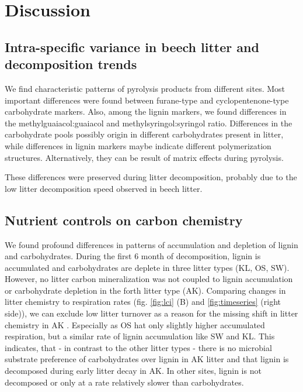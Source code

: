 \section{Discussion}

\subsection{Intra-specific variance in beech litter and decomposition trends}

We find characteristic patterns of pyrolysis products from different sites. Most important differences were found between furane-type and cyclopentenone-type carbohydrate markers. Also, among the lignin markers, we found differences in the methylguaiacol:guaiacol and methylsyringol:syringol ratio. Differences in the carbohydrate pools possibly origin in different carbohydrates present in litter, while differences in lignin markers maybe indicate different polymerization structures. Alternatively, they can be result of matrix effects during pyrolysis. 

These differences were preserved during litter decomposition, probably due to the low litter decomposition speed observed in beech litter.

\subsection{Nutrient controls on carbon chemistry}

We found profound differences in patterns of accumulation and depletion of lignin and carbohydrates. During the first 6 month of decomposition, lignin is accumulated and carbohydrates are deplete in three litter types (KL, OS, SW). However, no litter carbon mineralization was not coupled to lignin accumulation or carbohydrate depletion in the forth litter type (AK). Comparing changes in litter chemistry to respiration rates (fig. \ref{fig:lci} (B) and \ref{fig:timeseries} (right side)), we can exclude low litter turnover as a reason for the missing shift in litter chemistry in AK . Especially as OS hat only slightly higher accumulated respiration, but a similar rate of lignin accumulation like SW and KL. This indicates, that - in contrast to the other litter types - there is no microbial substrate preference of carbohydrates over lignin in AK litter and that lignin is decomposed during early litter decay in AK. In other sites, lignin is not decomposed or only at a rate relatively slower than carbohydrates. 

